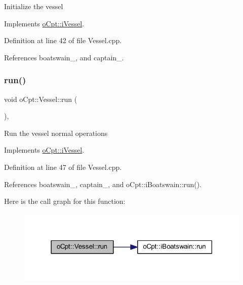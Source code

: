 Initialize the vessel 

Implements \hyperlink{classo_cpt_1_1i_vessel_a866ddfa5330bbb24277de57554a41811}{o\+Cpt\+::i\+Vessel}.



Definition at line 42 of file Vessel.\+cpp.



References boatswain\+\_\+, and captain\+\_\+.

\hypertarget{classo_cpt_1_1_vessel_a6cd07e32cc601b1f3a45881b42ea36ef}{}\label{classo_cpt_1_1_vessel_a6cd07e32cc601b1f3a45881b42ea36ef} 
\subsubsection{\texorpdfstring{run()}{run()}}
{\footnotesize\ttfamily void o\+Cpt\+::\+Vessel\+::run (\begin{DoxyParamCaption}{ }\end{DoxyParamCaption})\hspace{0.3cm}{\ttfamily [override]}, {\ttfamily [virtual]}}

Run the vessel normal operations 

Implements \hyperlink{classo_cpt_1_1i_vessel_a636c138c3d8cb4ddbb2725d36fb12e07}{o\+Cpt\+::i\+Vessel}.



Definition at line 47 of file Vessel.\+cpp.



References boatswain\+\_\+, captain\+\_\+, and o\+Cpt\+::i\+Boatswain\+::run().

Here is the call graph for this function\+:\nopagebreak
\begin{figure}[H]
\begin{center}
\leavevmode
\includegraphics[width=318pt]{classo_cpt_1_1_vessel_a6cd07e32cc601b1f3a45881b42ea36ef_cgraph}
\end{center}
\end{figure}
\hypertarget{classo_cpt_1_1_vessel_a87e321618ea1d1ca21fffbe64bbffbc0}{}\label{classo_cpt_1_1_vessel_a87e321618ea1d1ca21fffbe64bbffbc0} 

